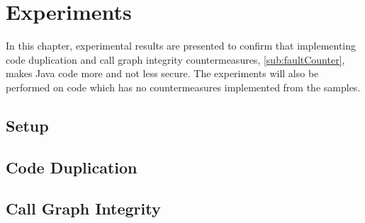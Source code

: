 \chapter{Experiments}
In this chapter, experimental results are presented to confirm that implementing code duplication and call graph integrity countermeasures, \cref{sub:faultCounter}, makes Java code more and not less secure. The experiments will also be performed on code which has no countermeasures implemented from the \jc samples.
%
\section{Setup}

\section{Code Duplication}

\section{Call Graph Integrity}

